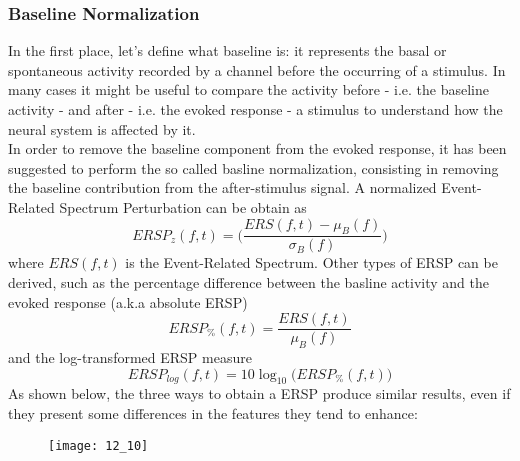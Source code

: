 \subsubsection{Baseline Normalization}
In the first place, let's define what baseline is: it represents the basal or spontaneous
activity recorded by a channel before the occurring of a stimulus. In many cases it might
be useful to compare the activity before - i.e. the baseline activity - and after - i.e. the
evoked response - a stimulus to understand how the neural system is affected by it.\\
In order to remove the baseline component from the evoked response, it has been suggested to
perform the so called basline normalization, consisting in removing the baseline contribution
from the after-stimulus signal. A normalized Event-Related Spectrum Perturbation can be
obtain as
\begin{equation*}
    ERSP_z(f,t)=\biggl(\frac{ERS(f,t)-\mu_B(f)}{\sigma_B(f)}\biggr)
\end{equation*}
where \(ERS(f,t)\) is the Event-Related Spectrum.
Other types of ERSP can be derived, such as the percentage difference between the basline
activity and the evoked response (a.k.a absolute ERSP)
\begin{equation*}
    ERSP_{\%}(f,t)=\frac{ERS(f,t)}{\mu_{B}(f)}
\end{equation*}
and the log-transformed ERSP measure
\begin{equation*}
    ERSP_{log}(f,t)=10\log_{10}\bigl(ERSP_{\%}(f,t)\bigr)
\end{equation*}
As shown below, the three ways to obtain a ERSP produce similar results, even if they
present some differences in the features they tend to enhance:
\begin{figure}[H]
    \centering
    \texttt{[image: 12\_10]}
\end{figure}
